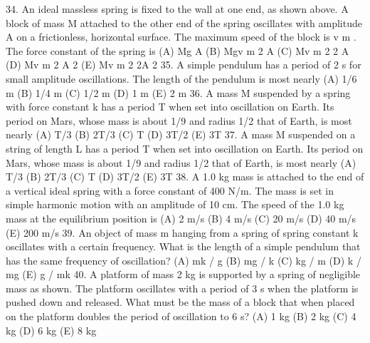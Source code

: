 34. An ideal massless spring is fixed to the wall at one end, as shown above. A block of mass M attached to the
other end of the spring oscillates with amplitude A on a frictionless, horizontal surface. The maximum speed of
the block is v m . The force constant of the spring is
(A)
Mg
A
(B)
Mgv m
2 A
(C)
Mv m 2
2 A
(D)
Mv m 2
A 2
(E)
Mv m 2
2A 2
35. A simple pendulum has a period of 2 s for small amplitude oscillations. The length of the pendulum is most
nearly
(A) 1/6 m (B) 1/4 m
(C) 1/2 m
(D) 1 m
(E) 2 m
36. A mass M suspended by a spring with force constant k has a period T when set into oscillation on Earth. Its
period on Mars, whose mass is about 1/9 and radius 1/2 that of Earth, is most nearly
(A) T/3
(B) 2T/3
(C) T
(D) 3T/2
(E) 3T
37. A mass M suspended on a string of length L has a period T when set into oscillation on Earth. Its period on
Mars, whose mass is about 1/9 and radius 1/2 that of Earth, is most nearly
(A) T/3
(B) 2T/3
(C) T
(D) 3T/2
(E) 3T
38. A 1.0 kg mass is attached to the end of a vertical ideal spring with a force constant of 400 N/m. The mass is set
in simple harmonic motion with an amplitude of 10 cm. The speed of the 1.0 kg mass at the equilibrium
position is
(A) 2 m/s
(B) 4 m/s
(C) 20 m/s
(D) 40 m/s
(E) 200 m/s
39. An object of mass m hanging from a spring of spring constant k oscillates with a certain frequency. What is the
length of a simple pendulum that has the same frequency of oscillation?
(A) mk / g (B) mg / k (C) kg / m (D) k / mg (E) g / mk
40. A platform of mass 2 kg is supported by a spring of negligible mass as shown.
The platform oscillates with a period of 3 s when the platform is pushed down
and released. What must be the mass of a block that when placed on the
platform doubles the period of oscillation to 6 s?
(A) 1 kg (B) 2 kg (C) 4 kg (D) 6 kg (E) 8 kg







\endinput


